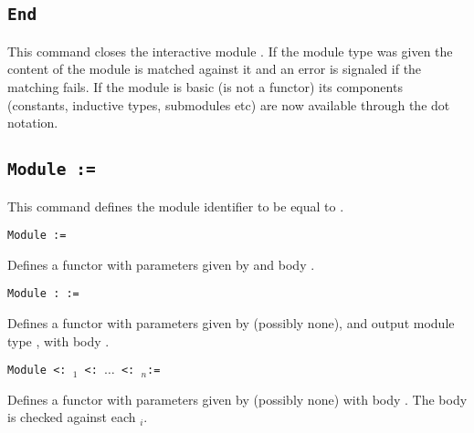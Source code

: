 \subsection{\tt End {\ident}
}

This command closes the interactive module {\ident}. If the module type
was given the content of the module is matched against it and an error
is signaled if the matching fails. If the module is basic (is not a
functor) its components (constants, inductive types, submodules etc) are
now available through the dot notation.

\begin{ErrMsgs}
\item {}
\item {}
\item {}
\end{ErrMsgs}


\subsection{\tt Module {\ident} := {\modexpr}
}

This command defines the module identifier {\ident} to be equal to
{\modexpr}. 

\begin{Variants}
\item{\tt Module {\ident} {\modbindings} := {\modexpr}}

 Defines a functor with parameters given by {\modbindings} and body {\modexpr}.

%
%

\item{\tt Module {\ident} {\modbindings} \verb.:. {\modtype} :=
    {\modexpr}}

  Defines a functor with parameters given by {\modbindings} (possibly none),
  and output module type {\modtype}, with body {\modexpr}. 

\item{\tt Module {\ident} {\modbindings} \verb.<:.  {\modtype$_1$} \verb.<:. $\ldots$ \verb.<:. {\modtype$_n$}:=
    {\modexpr}}

  Defines a functor with parameters given by {\modbindings} (possibly none) 
  with body {\modexpr}. The body is checked against each {\modtype$_i$}.

\end{Variants}

